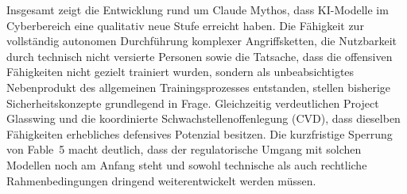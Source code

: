 Insgesamt zeigt die Entwicklung rund um Claude Mythos, dass KI-Modelle
im Cyberbereich eine qualitativ neue Stufe erreicht haben. Die Fähigkeit
zur vollständig autonomen Durchführung komplexer Angriffsketten, die
Nutzbarkeit durch technisch nicht versierte Personen sowie die Tatsache, dass die offensiven Fähigkeiten nicht gezielt trainiert
wurden, sondern als unbeabsichtigtes Nebenprodukt des allgemeinen
Trainingsprozesses entstanden, stellen bisherige Sicherheitskonzepte
grundlegend in Frage. Gleichzeitig verdeutlichen Project Glasswing und
die koordinierte Schwachstellenoffenlegung (CVD), dass dieselben Fähigkeiten
erhebliches defensives Potenzial besitzen. Die kurzfristige Sperrung
von Fable~5 macht deutlich, dass der regulatorische Umgang mit solchen
Modellen noch am Anfang steht und sowohl technische als auch rechtliche
Rahmenbedingungen dringend weiterentwickelt werden müssen.